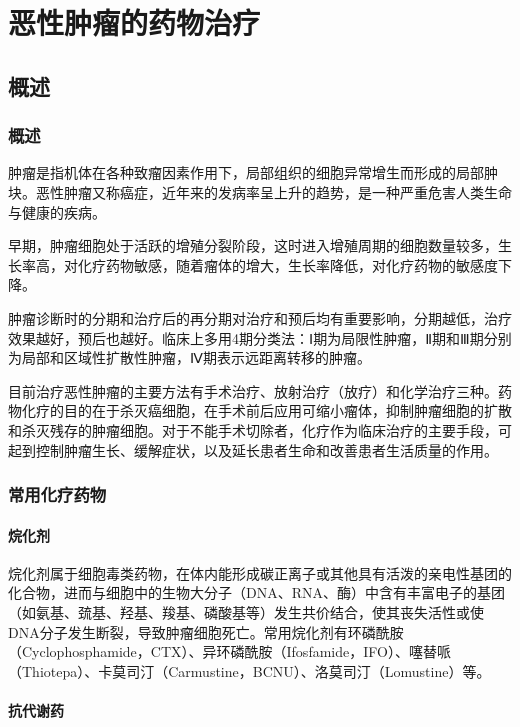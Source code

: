 \chapter{恶性肿瘤的药物治疗}

\section{概述}

\subsection{概述}

肿瘤是指机体在各种致瘤因素作用下，局部组织的细胞异常增生而形成的局部肿块。恶性肿瘤又称癌症，近年来的发病率呈上升的趋势，是一种严重危害人类生命与健康的疾病。

早期，肿瘤细胞处于活跃的增殖分裂阶段，这时进入增殖周期的细胞数量较多，生长率高，对化疗药物敏感，随着瘤体的增大，生长率降低，对化疗药物的敏感度下降。

肿瘤诊断时的分期和治疗后的再分期对治疗和预后均有重要影响，分期越低，治疗效果越好，预后也越好。临床上多用4期分类法：Ⅰ期为局限性肿瘤，Ⅱ期和Ⅲ期分别为局部和区域性扩散性肿瘤，Ⅳ期表示远距离转移的肿瘤。

目前治疗恶性肿瘤的主要方法有手术治疗、放射治疗（放疗）和化学治疗三种。药物化疗的目的在于杀灭癌细胞，在手术前后应用可缩小瘤体，抑制肿瘤细胞的扩散和杀灭残存的肿瘤细胞。对于不能手术切除者，化疗作为临床治疗的主要手段，可起到控制肿瘤生长、缓解症状，以及延长患者生命和改善患者生活质量的作用。

\subsection{常用化疗药物}

\subsubsection{烷化剂}

烷化剂属于细胞毒类药物，在体内能形成碳正离子或其他具有活泼的亲电性基团的化合物，进而与细胞中的生物大分子（DNA、RNA、酶）中含有丰富电子的基团（如氨基、巯基、羟基、羧基、磷酸基等）发生共价结合，使其丧失活性或使DNA分子发生断裂，导致肿瘤细胞死亡。常用烷化剂有环磷酰胺（Cyclophosphamide，CTX）、异环磷酰胺（Ifosfamide，IFO）、噻替哌（Thiotepa）、卡莫司汀（Carmustine，BCNU）、洛莫司汀（Lomustine）等。

\subsubsection{抗代谢药}

